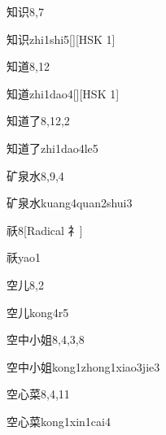 \begin{entry}{知识}{8,7}
  \begin{phonetics}{知识}{zhi1shi5}[][HSK 1]
  \end{phonetics}
\end{entry}

\begin{entry}{知道}{8,12}
  \begin{phonetics}{知道}{zhi1dao4}[][HSK 1]
  \end{phonetics}
\end{entry}

\begin{entry}{知道了}{8,12,2}
  \begin{phonetics}{知道了}{zhi1dao4le5}
  \end{phonetics}
\end{entry}

\begin{entry}{矿泉水}{8,9,4}
  \begin{phonetics}{矿泉水}{kuang4quan2shui3}
  \end{phonetics}
\end{entry}

\begin{entry}{祅}{8}[Radical 礻]
  \begin{phonetics}{祅}{yao1}
  \end{phonetics}
\end{entry}

\begin{entry}{空儿}{8,2}
  \begin{phonetics}{空儿}{kong4r5}
  \end{phonetics}
\end{entry}

\begin{entry}{空中小姐}{8,4,3,8}
  \begin{phonetics}{空中小姐}{kong1zhong1xiao3jie3}
  \end{phonetics}
\end{entry}

\begin{entry}{空心菜}{8,4,11}
  \begin{phonetics}{空心菜}{kong1xin1cai4}
  \end{phonetics}
\end{entry}

